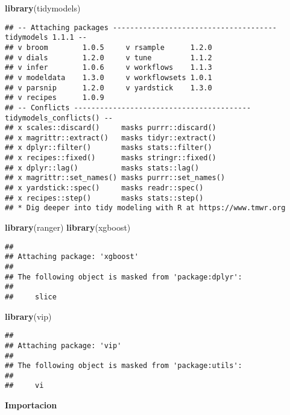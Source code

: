 \documentclass[
]{article}
\newenvironment{Shaded}{\begin{snugshade}}{\end{snugshade}}
\newcommand{\FunctionTok}[1]{\textcolor[rgb]{0.13,0.29,0.53}{\textbf{#1}}}
\newcommand{\NormalTok}[1]{#1}
\begin{document}
\begin{Shaded}
\begin{Highlighting}[]
\FunctionTok{library}\NormalTok{(tidymodels)}
\end{Highlighting}
\end{Shaded}

\begin{verbatim}
## -- Attaching packages -------------------------------------- tidymodels 1.1.1 --
## v broom        1.0.5     v rsample      1.2.0
## v dials        1.2.0     v tune         1.1.2
## v infer        1.0.6     v workflows    1.1.3
## v modeldata    1.3.0     v workflowsets 1.0.1
## v parsnip      1.2.0     v yardstick    1.3.0
## v recipes      1.0.9     
## -- Conflicts ----------------------------------------- tidymodels_conflicts() --
## x scales::discard()     masks purrr::discard()
## x magrittr::extract()   masks tidyr::extract()
## x dplyr::filter()       masks stats::filter()
## x recipes::fixed()      masks stringr::fixed()
## x dplyr::lag()          masks stats::lag()
## x magrittr::set_names() masks purrr::set_names()
## x yardstick::spec()     masks readr::spec()
## x recipes::step()       masks stats::step()
## * Dig deeper into tidy modeling with R at https://www.tmwr.org
\end{verbatim}

\begin{Shaded}
\begin{Highlighting}[]
\FunctionTok{library}\NormalTok{(ranger)}
\FunctionTok{library}\NormalTok{(xgboost)}
\end{Highlighting}
\end{Shaded}

\begin{verbatim}
## 
## Attaching package: 'xgboost'
## 
## The following object is masked from 'package:dplyr':
## 
##     slice
\end{verbatim}

\begin{Shaded}
\begin{Highlighting}[]
\FunctionTok{library}\NormalTok{(vip)}
\end{Highlighting}
\end{Shaded}

\begin{verbatim}
## 
## Attaching package: 'vip'
## 
## The following object is masked from 'package:utils':
## 
##     vi
\end{verbatim}

\textbf{Importacion}
\end{document}
